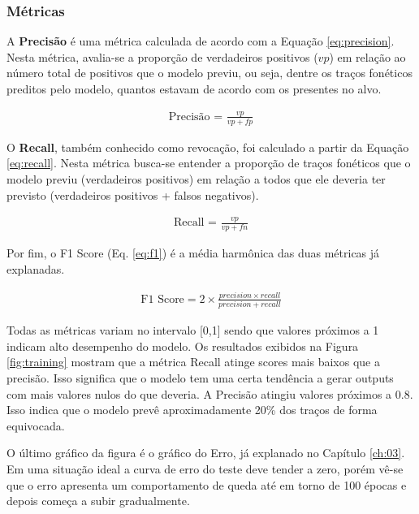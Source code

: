 \subsubsection{Métricas}

A \textbf{Precisão} é uma métrica calculada de acordo com a Equação \ref{eq:precision}. Nesta métrica, avalia-se a proporção de verdadeiros positivos ($vp$) em relação ao número total de positivos que o modelo previu, ou seja, dentre os traços fonéticos preditos pelo modelo, quantos estavam de acordo com os presentes no alvo.


\begin{align}\label{eq:precision}
\text{Precisão = } \frac{vp}{vp + fp}
\end{align}

O \textbf{Recall}, também conhecido como revocação, foi calculado a partir da Equação \ref{eq:recall}. Nesta métrica busca-se entender a proporção de traços fonéticos que o modelo previu (verdadeiros positivos) em relação a todos que ele deveria ter previsto (verdadeiros positivos + falsos negativos). 

\begin{align}\label{eq:recall}
\text{Recall = } \frac{vp}{vp + fn}
\end{align}

Por fim, o F1 Score (Eq. \ref{eq:f1}) é a média harmônica das duas métricas já explanadas.

\begin{center}
\begin{align}\label{eq:f1}
  \text{F1 Score} = 2 \times \frac{precision \times recall}{precision + recall}
  \end{align}
\end{center}

Todas as métricas variam no intervalo [0,1] sendo que valores próximos a 1 indicam alto desempenho do modelo.
Os resultados exibidos na Figura \ref{fig:training} mostram que a métrica Recall atinge scores mais baixos que a precisão. Isso significa que o modelo tem uma certa tendência a gerar outputs com mais valores nulos do que deveria. A Precisão atingiu valores próximos a 0.8. Isso indica que o modelo prevê aproximadamente 20\% dos traços de forma equivocada.

O último gráfico da figura é o gráfico do Erro, já explanado no Capítulo \ref{ch:03}. Em uma situação ideal a curva de erro do teste deve tender a zero, porém vê-se que o erro apresenta um comportamento de queda até em torno de 100 épocas e depois começa a subir gradualmente. 



